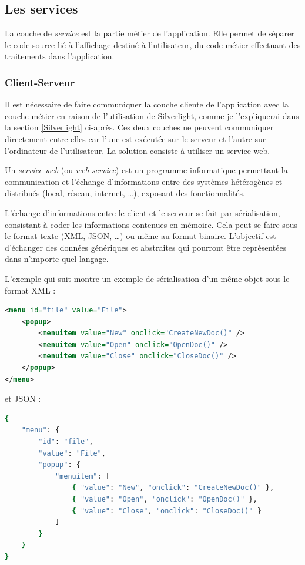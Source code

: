 
\subsection{Les services}

La couche de \textit{service} est la partie métier de l'application.
Elle permet de séparer le code source lié à l'affichage destiné à l'utilisateur, du code métier effectuant des traitements dans l'application.


\subsubsection{Client-Serveur}


Il est nécessaire de faire communiquer la couche cliente de l'application avec la couche métier en raison de l'utilisation de Silverlight, comme je l'expliquerai dans la section \ref{Silverlight} ci-après.
Ces deux couches ne peuvent communiquer directement entre elles car l'une est exécutée sur le serveur et l'autre sur l'ordinateur de l'utilisateur.
La solution consiste à utiliser un service web.



Un \textit{service web} (ou \textit{web service}) est un programme informatique permettant la communication et l'échange d'informations entre des systèmes hétérogènes et distribués (local, réseau, internet, \ldots), exposant des fonctionnalités.

L'échange d'informations entre le client et le serveur se fait par sérialisation, consistant à coder les informations contenues en mémoire.
Cela peut se faire sous le format texte (XML, JSON, \ldots) ou même au format binaire.
L'objectif est d'échanger des données génériques et abstraites qui pourront être représentées dans n'importe quel langage.

L'exemple qui suit montre un exemple de sérialisation d'un même objet sous le format XML :
\begin{lstlisting}[language = xml]
<menu id="file" value="File">
	<popup>
		<menuitem value="New" onclick="CreateNewDoc()" />
		<menuitem value="Open" onclick="OpenDoc()" />
		<menuitem value="Close" onclick="CloseDoc()" />
	</popup>
</menu>
\end{lstlisting}
et JSON :
\begin{lstlisting}[language = sh]
{
	"menu": {
		"id": "file",
		"value": "File",
		"popup": {
			"menuitem": [
				{ "value": "New", "onclick": "CreateNewDoc()" },
				{ "value": "Open", "onclick": "OpenDoc()" },
				{ "value": "Close", "onclick": "CloseDoc()" }
			]
		}
	}
}
\end{lstlisting}


